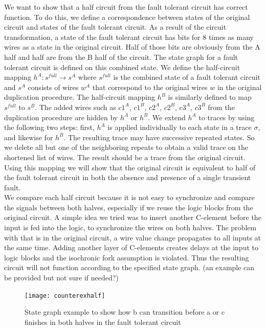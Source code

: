 \documentclass[12pt]{report}
\begin{document}
We want to show that a half circuit from the fault tolerant circuit has correct function.  To do this, we define a correspondence between states of the original circuit and states of the fault tolerant circuit.  As a result of the circuit transformation, a state of the fault tolerant circuit has bits for 8 times as many wires as a state in the original circuit.  Half of those bits are obviously from the A half and half are from the B half of the circuit.  The state graph for a fault tolerant circuit is defined on this combined state.  We define the half-circuit mapping $h^A: s^{\mathit{full}} \to s^A$ where $s^{\mathit{full}}$ is the combined state of a fault tolerant circuit and $s^A$ consists of wires $w^A$ that correspond to the original wires $w$ in the original duplication procedure.  The half-circuit mapping $h^B$ is similarly defined to map $s^{\mathit{full}}$ to $s^B$.  The added wires such as $c1^A$, $c1^B$, $c2^A$, $c2^B$, $c3^A$, $c3^B$ from the duplication procedure are hidden by $h^A$ or $h^B$.  We extend $h^A$ to traces by using the following two steps: first, $h^A$ is applied individually to each state in a trace $\sigma$, and likewise for $h^B$.  %
The resulting trace may have successive repeated states.  So we delete all but one of the neighboring repeats to obtain a valid trace on the shortened list of wires.  The result should be a trace from the original circuit.
 Using this mapping we will show that the original circuit is equivalent to half of the fault tolerant circuit in both the absence and presence of a single transient fault.
\\

We compare each half circuit because it is not easy to synchronize and compare the signals between both halves, especially if we reuse the logic blocks from the original circuit.  A simple idea we tried was to insert another C-element before the input is fed into the logic, to synchronize the wires on both halves.  The problem with that is in the original circuit, a wire value change propagates to all inputs at the same time.  Adding another layer of C-elements creates delays at the input to logic blocks and the isochronic fork assumption is violated.  Thus the resulting circuit will not function according to the specified state graph.  (an example can be provided but not sure if needed?)\\  
\begin{figure}
  \centering
    \texttt{[image: counterexhalf]}
  \caption{State graph example to show how b can transition before a or c finishes in both halves in the fault tolerant circuit}
  \label{fig:counterexhalf}
\end{figure}
\end{document}

